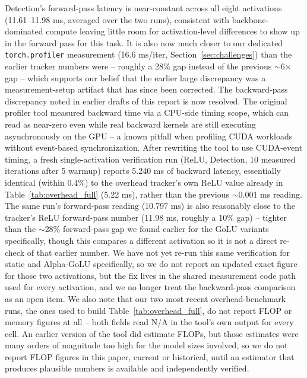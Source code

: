 \documentclass[conference]{IEEEtran}
\begin{document}
Detection's forward-pass latency is near-constant across all eight activations (11.61--11.98 ms, averaged over the two runs), consistent with backbone-dominated compute leaving little room for activation-level differences to show up in the forward pass for this task. It is also now much closer to our dedicated \texttt{torch.profiler} measurement (16.6 ms/iter, Section~\ref{sec:challenges}) than the earlier tracker numbers were -- roughly a 28\% gap instead of the previous $\sim$6$\times$ gap -- which supports our belief that the earlier large discrepancy was a measurement-setup artifact that has since been corrected. The backward-pass discrepancy noted in earlier drafts of this report is now resolved. The original profiler tool measured backward time via a CPU-side timing scope, which can read as near-zero even while real backward kernels are still executing asynchronously on the GPU -- a known pitfall when profiling CUDA workloads without event-based synchronization. After rewriting the tool to use CUDA-event timing, a fresh single-activation verification run (ReLU, Detection, 10 measured iterations after 5 warmup) reports 5.240 ms of backward latency, essentially identical (within 0.4\%) to the overhead tracker's own ReLU value already in Table~\ref{tab:overhead_full} (5.22 ms), rather than the previous $\sim$0.001 ms reading. The same run's forward-pass reading (10.797 ms) is also reasonably close to the tracker's ReLU forward-pass number (11.98 ms, roughly a 10\% gap) -- tighter than the $\sim$28\% forward-pass gap we found earlier for the GoLU variants specifically, though this compares a different activation so it is not a direct re-check of that earlier number. We have not yet re-run this same verification for static and Alpha-GoLU specifically, so we do not report an updated exact figure for those two activations, but the fix lives in the shared measurement code path used for every activation, and we no longer treat the backward-pass comparison as an open item. We also note that our two most recent overhead-benchmark runs, the ones used to build Table~\ref{tab:overhead_full}, do not report FLOP or memory figures at all -- both fields read N/A in the tool's own output for every cell. An earlier version of the tool did estimate FLOPs, but those estimates were many orders of magnitude too high for the model sizes involved, so we do not report FLOP figures in this paper, current or historical, until an estimator that produces plausible numbers is available and independently verified.
\end{document}
